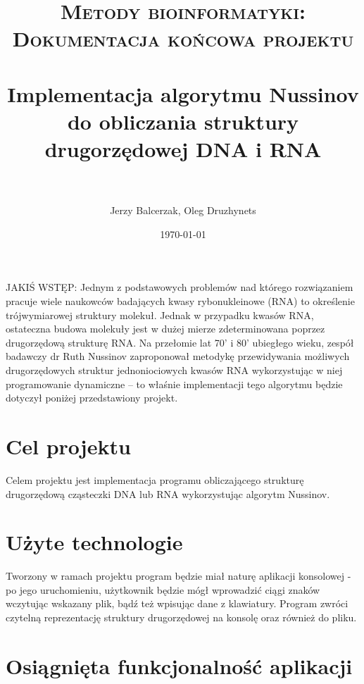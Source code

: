 \documentclass[paper=a4, fontsize=11pt]{scrartcl} %
\title{	
\normalfont \normalsize 
\textsc{Metody bioinformatyki: Dokumentacja końcowa projektu} \\ [25pt] %
\horrule{0.5pt} \\[0.4cm] %
\huge Implementacja algorytmu Nussinov do obliczania struktury drugorzędowej DNA i RNA \\ %
\horrule{2pt} \\[0.5cm] %
}
\author{Jerzy Balcerzak,
Oleg Druzhynets} %
\date{\normalsize\today} %
\numberwithin{equation}{section} %
\numberwithin{figure}{section} %
\numberwithin{table}{section} %
\begin{document}
\maketitle %


JAKIŚ WSTĘP: Jednym z podstawowych problemów nad którego rozwiązaniem pracuje wiele naukowców badających kwasy rybonukleinowe (RNA) to określenie trójwymiarowej struktury molekuł. Jednak w przypadku kwasów RNA, ostateczna budowa molekuły jest w dużej mierze zdeterminowana poprzez drugorzędową strukturę RNA. Na przełomie lat 70' i 80' ubiegłego wieku, zespół badawczy dr Ruth Nussinov zaproponował metodykę przewidywania możliwych drugorzędowych struktur jednoniociowych kwasów RNA \cite{bib:nuss1}\cite{bib:nuss2} wykorzystując w niej programowanie dynamiczne – to właśnie implementacji tego algorytmu będzie dotyczył poniżej przedstawiony projekt.

\section{Cel projektu}

	Celem projektu jest implementacja programu obliczającego strukturę drugorzędową cząsteczki DNA lub RNA wykorzystując algorytm Nussinov.





\section{Użyte technologie}

Tworzony w ramach projektu program będzie miał naturę aplikacji konsolowej - po jego uruchomieniu, użytkownik będzie mógł wprowadzić ciągi znaków wczytując wskazany plik, bądź też wpisując dane z klawiatury. 
Program zwróci czytelną reprezentację struktury drugorzędowej na konsolę oraz również do pliku.

\section{Osiągnięta funkcjonalność aplikacji}
\end{document}
